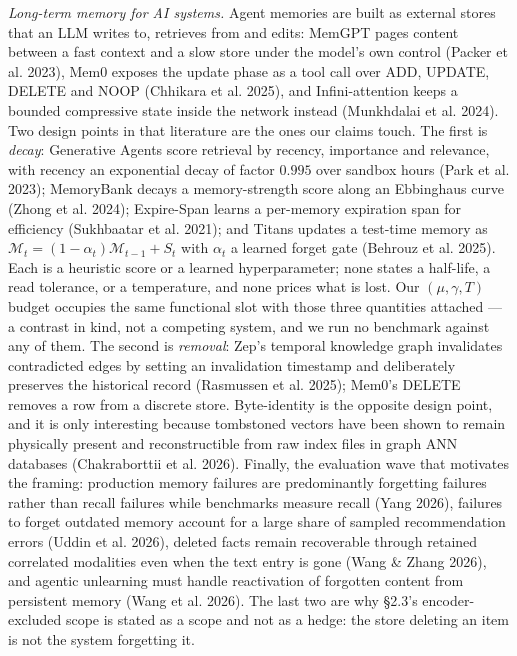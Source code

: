 \documentclass{article}
\begin{document}
\emph{Long-term memory for AI systems.} Agent memories are built as external stores that an LLM writes to, retrieves from and edits: MemGPT pages content between a fast context and a slow store under the model's own control (Packer et al. 2023), Mem0 exposes the update phase as a tool call over ADD, UPDATE, DELETE and NOOP (Chhikara et al. 2025), and Infini-attention keeps a bounded compressive state inside the network instead (Munkhdalai et al. 2024). Two design points in that literature are the ones our claims touch. The first is \emph{decay}: Generative Agents score retrieval by recency, importance and relevance, with recency an exponential decay of factor $0.995$ over sandbox hours (Park et al. 2023); MemoryBank decays a memory-strength score along an Ebbinghaus curve (Zhong et al. 2024); Expire-Span learns a per-memory expiration span for efficiency (Sukhbaatar et al. 2021); and Titans updates a test-time memory as $\mathcal M_t=(1-\alpha_t)\mathcal M_{t-1}+S_t$ with $\alpha_t$ a learned forget gate (Behrouz et al. 2025). Each is a heuristic score or a learned hyperparameter; none states a half-life, a read tolerance, or a temperature, and none prices what is lost. Our $(\mu,\gamma,T)$ budget occupies the same functional slot with those three quantities attached --- a contrast in kind, not a competing system, and we run no benchmark against any of them. The second is \emph{removal}: Zep's temporal knowledge graph invalidates contradicted edges by setting an invalidation timestamp and deliberately preserves the historical record (Rasmussen et al. 2025); Mem0's DELETE removes a row from a discrete store. Byte-identity is the opposite design point, and it is only interesting because tombstoned vectors have been shown to remain physically present and reconstructible from raw index files in graph ANN databases (Chakraborttii et al. 2026). Finally, the evaluation wave that motivates the framing: production memory failures are predominantly forgetting failures rather than recall failures while benchmarks measure recall (Yang 2026), failures to forget outdated memory account for a large share of sampled recommendation errors (Uddin et al. 2026), deleted facts remain recoverable through retained correlated modalities even when the text entry is gone (Wang \& Zhang 2026), and agentic unlearning must handle reactivation of forgotten content from persistent memory (Wang et al. 2026). The last two are why \S 2.3's encoder-excluded scope is stated as a scope and not as a hedge: the store deleting an item is not the system forgetting it.
\end{document}
